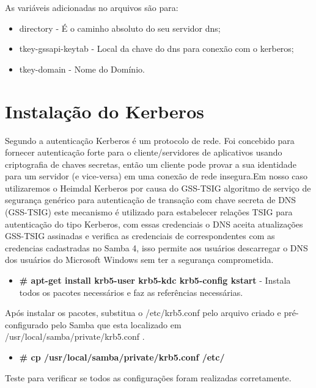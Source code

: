 As variáveis adicionadas no arquivos são para:

\begin{itemize}
	\item{directory} -  É o caminho absoluto do seu servidor dns;
	\item{tkey-gssapi-keytab} - Local da chave do dns para conexão com o kerberos;
	\item{tkey-domain} - Nome do Domínio.
\end{itemize}

\section{Instalação do Kerberos}

Segundo \cite{HEIMDAL} a autenticação Kerberos é um protocolo de rede. Foi concebido para fornecer autenticação forte para o cliente/servidores de aplicativos usando criptografia de chaves secretas, então um cliente pode provar a sua identidade para um servidor (e vice-versa) em uma conexão de rede insegura.Em nosso caso utilizaremos o Heimdal Kerberos por causa do GSS-TSIG algoritmo de serviço de segurança genérico para autenticação de transação com chave secreta de DNS (GSS-TSIG) este mecanismo é utilizado para estabelecer relações TSIG para autenticação do tipo Kerberos, com essas credenciais o DNS aceita atualizações GSS-TSIG assinadas e verifica as credenciais de correspondentes com as credencias cadastradas no Samba 4, isso permite aos usuários descarregar o DNS dos usuários do Microsoft Windows sem ter a segurança comprometida.

\begin{itemize}
	\item \textbf{\# apt-get install krb5-user krb5-kdc krb5-config kstart} - Instala todos os pacotes necessários e faz as referências necessárias.
\end{itemize}

Após instalar os pacotes, substitua o /etc/krb5.conf pelo arquivo criado e pré-configurado pelo Samba que esta localizado em /usr/local/samba/private/krb5.conf .

\begin{itemize}
	\item \textbf{\# cp /usr/local/samba/private/krb5.conf  /etc/}
\end{itemize}

Teste para verificar se todos as configurações foram realizadas corretamente.


